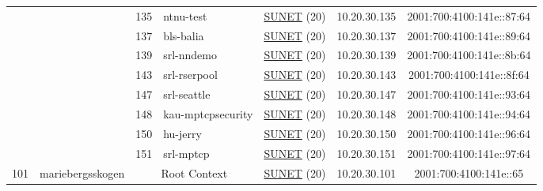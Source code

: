 \begin{small}
\begin{center}
\begin{longtable}{|c|c|c|c|c|c|c|c|}
  &  & \tiny{135} & \multicolumn{1}{|l|}{\tiny{ntnu-test}} & \multicolumn{2}{|c|}{\tiny{\href{http://www.sunet.se}{SUNET} (20)}} & \tiny{10.20.30.135} & \tiny{2001:700:4100:141e::87:64} \\* \cline{3-3}\cline{4-4}\cline{5-5}\cline{6-6}\cline{7-7}\cline{8-8}
  &  & \tiny{137} & \multicolumn{1}{|l|}{\tiny{bls-balia}} & \multicolumn{2}{|c|}{\tiny{\href{http://www.sunet.se}{SUNET} (20)}} & \tiny{10.20.30.137} & \tiny{2001:700:4100:141e::89:64} \\* \cline{3-3}\cline{4-4}\cline{5-5}\cline{6-6}\cline{7-7}\cline{8-8}
  &  & \tiny{139} & \multicolumn{1}{|l|}{\tiny{srl-nndemo}} & \multicolumn{2}{|c|}{\tiny{\href{http://www.sunet.se}{SUNET} (20)}} & \tiny{10.20.30.139} & \tiny{2001:700:4100:141e::8b:64} \\* \cline{3-3}\cline{4-4}\cline{5-5}\cline{6-6}\cline{7-7}\cline{8-8}
  &  & \tiny{143} & \multicolumn{1}{|l|}{\tiny{srl-rserpool}} & \multicolumn{2}{|c|}{\tiny{\href{http://www.sunet.se}{SUNET} (20)}} & \tiny{10.20.30.143} & \tiny{2001:700:4100:141e::8f:64} \\* \cline{3-3}\cline{4-4}\cline{5-5}\cline{6-6}\cline{7-7}\cline{8-8}
  &  & \tiny{147} & \multicolumn{1}{|l|}{\tiny{srl-seattle}} & \multicolumn{2}{|c|}{\tiny{\href{http://www.sunet.se}{SUNET} (20)}} & \tiny{10.20.30.147} & \tiny{2001:700:4100:141e::93:64} \\* \cline{3-3}\cline{4-4}\cline{5-5}\cline{6-6}\cline{7-7}\cline{8-8}
  &  & \tiny{148} & \multicolumn{1}{|l|}{\tiny{kau-mptcpsecurity}} & \multicolumn{2}{|c|}{\tiny{\href{http://www.sunet.se}{SUNET} (20)}} & \tiny{10.20.30.148} & \tiny{2001:700:4100:141e::94:64} \\* \cline{3-3}\cline{4-4}\cline{5-5}\cline{6-6}\cline{7-7}\cline{8-8}
  &  & \tiny{150} & \multicolumn{1}{|l|}{\tiny{hu-jerry}} & \multicolumn{2}{|c|}{\tiny{\href{http://www.sunet.se}{SUNET} (20)}} & \tiny{10.20.30.150} & \tiny{2001:700:4100:141e::96:64} \\* \cline{3-3}\cline{4-4}\cline{5-5}\cline{6-6}\cline{7-7}\cline{8-8}
  &  & \tiny{151} & \multicolumn{1}{|l|}{\tiny{srl-mptcp}} & \multicolumn{2}{|c|}{\tiny{\href{http://www.sunet.se}{SUNET} (20)}} & \tiny{10.20.30.151} & \tiny{2001:700:4100:141e::97:64} \\ \hline
 \multirow{12}{*}{\tiny{101}} & \multicolumn{1}{|l|}{\multirow{12}{*}{\tiny{mariebergsskogen}}} & \multicolumn{2}{|c|}{\tiny{Root Context}} & \multicolumn{2}{|c|}{\tiny{\href{http://www.sunet.se}{SUNET} (20)}} & \tiny{10.20.30.101} & \tiny{2001:700:4100:141e::65} \\* \cline{3-3}\cline{4-4}\cline{5-5}\cline{6-6}\cline{7-7}\cline{8-8}

\end{longtable}
\end{center}
\end{small}
